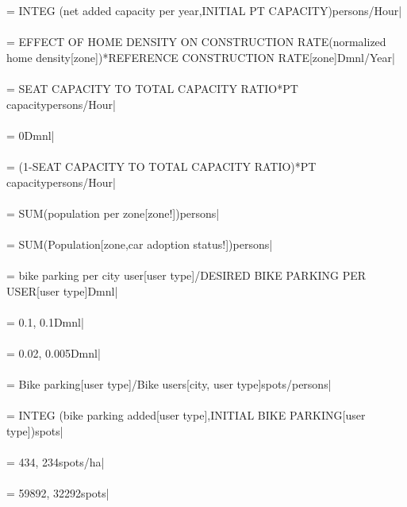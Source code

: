  = {\small  INTEG (net added capacity per year,INITIAL PT CAPACITY)persons/Hour|} \\ \\ 
 = {\small EFFECT OF HOME DENSITY ON CONSTRUCTION RATE(normalized home density[zone])*REFERENCE CONSTRUCTION RATE[zone]Dmnl/Year|} \\ \\ 
 = {\small SEAT CAPACITY TO TOTAL CAPACITY RATIO*PT capacitypersons/Hour|} \\ \\ 
 = {\small 0Dmnl|} \\ \\ 
 = {\small (1-SEAT CAPACITY TO TOTAL CAPACITY RATIO)*PT capacitypersons/Hour|} \\ \\ 
 = {\small SUM(population per zone[zone!])persons|} \\ \\ 
 = {\small SUM(Population[zone,car adoption status!])persons|} \\ \\ 
 = {\small bike parking per city user[user type]/DESIRED BIKE PARKING PER USER[user type]Dmnl|} \\ \\ 
 = {\small 0.1, 0.1Dmnl|} \\ \\ 
 = {\small 0.02, 0.005Dmnl|} \\ \\ 
 = {\small Bike parking[user type]/Bike users[city, user type]spots/persons|} \\ \\ 
 = {\small  INTEG (bike parking added[user type],INITIAL BIKE PARKING[user type])spots|} \\ \\ 
 = {\small 434, 234spots/ha|} \\ \\ 
 = {\small 59892, 32292spots|} \\ \\ 
